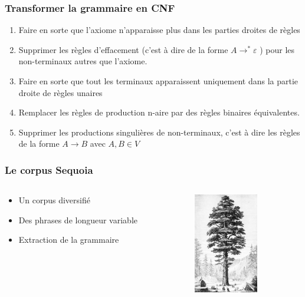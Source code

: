 \documentclass[table]{beamer}
\begin{document}
\begin{frame}
 \frametitle{Transformer la grammaire en CNF}
 \begin{enumerate}
 \item<1>{ Faire en sorte que l'axiome n'apparaisse plus dans les parties droites de règles}
 \item<1>{Supprimer les règles d'effacement (c'est à dire de la forme $A \rightarrow^*\varepsilon$ ) pour les non-terminaux autres que l'axiome.}
 \item<1>{Faire en sorte que tout les terminaux apparaissent uniquement dans la partie droite de règles unaires }
 \item<1-2>{Remplacer les règles de production n-aire par des règles binaires équivalentes.}
 \item<1-2>{Supprimer les productions singulières de non-terminaux, c'est à dire les règles de la forme $A \rightarrow B$ avec $A,B \in V$ }
 \end{enumerate}
 
\end{frame}
% 





\begin{frame}
  \frametitle{Le corpus Sequoia}
  \begin{columns}
  \begin{column}{0.5\textwidth}
    \begin{itemize}
     \item{ Un corpus diversifié}
     \item{ Des phrases de longueur variable}
     \item{ Extraction de la grammaire}
    \end{itemize}
  \end{column}
  \begin{column}{0.5\textwidth}
  \includegraphics[width=80pt,]{PSM_V03_D341_Sequoia_gigantea_of_california.jpg}  
  \end{column}
  \end{columns}
\end{frame}
\end{document}
